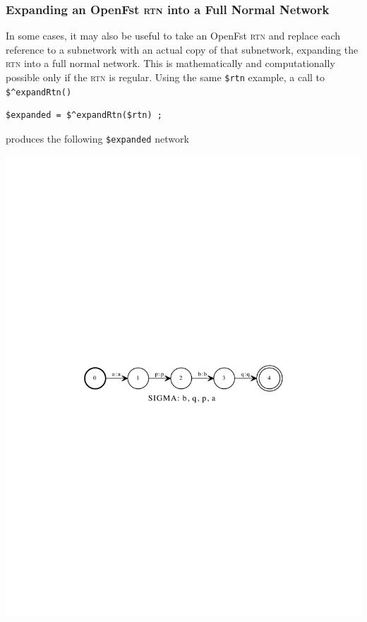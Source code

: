 \documentclass[letterpaper,12pt]{article}
\newcommand{\acro}{\textsc}
\begin{document}
\subsubsection{Expanding an OpenFst \acro{rtn} into a Full Normal Network}

In some cases, it may also be useful to take an OpenFst \acro{rtn} and replace
each reference to a subnetwork with an actual copy of that subnetwork,
expanding the \acro{rtn} into a full normal network.  This is mathematically and
computationally possible only if the \acro{rtn} is regular.  Using the same
\verb!$rtn! example, a call to \verb!$^expandRtn()!

\begin{Verbatim}[fontsize=\small]
$expanded = $^expandRtn($rtn) ;
\end{Verbatim}

\noindent
produces the following \verb!$expanded! network

\begin{center}
\includegraphics[width=\textwidth]{images/expanded.pdf}
\end{center}
\end{document}
